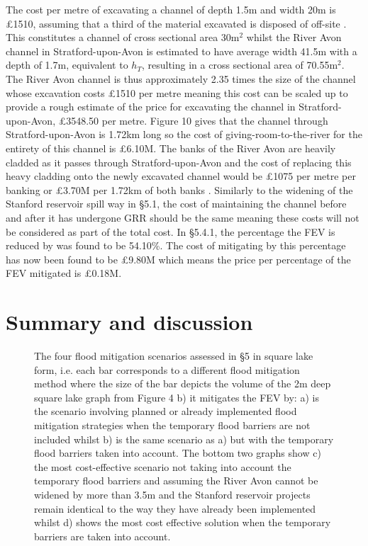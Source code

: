 \documentclass[11pt,a4paper]{article}
\begin{document}
\noindent The cost per metre of excavating a channel of depth 1.5m and width 20m is \pounds1510, assuming that a third of the material excavated is disposed of off-site \cite{cost1}. This constitutes a channel of cross sectional area 30m$^2$ whilst the River Avon channel in Stratford-upon-Avon is estimated to have average width 41.5m \cite{maps} with a depth of 1.7m, equivalent to $h_T$, resulting in a cross sectional area of 70.55m$^2$. The River Avon channel is thus approximately 2.35 times the size of the channel whose excavation costs \pounds1510 per metre meaning this cost can be scaled up to provide a rough estimate of the price for excavating the channel in Stratford-upon-Avon, \pounds3548.50 per metre. Figure 10 gives that the channel through Stratford-upon-Avon is 1.72km long so the cost of giving-room-to-the-river for the entirety of this channel is \pounds6.10M. The banks of the River Avon are heavily cladded as it passes through Stratford-upon-Avon and the cost of replacing this heavy cladding onto the newly excavated channel would be \pounds1075 per metre per banking or \pounds3.70M per 1.72km of both banks \cite{cost1}. Similarly to the widening of the Stanford reservoir spill way in \S5.1, the cost of maintaining the channel before and after it has undergone GRR should be the same meaning these costs will not be considered as part of the total cost. In \S 5.4.1, the percentage the FEV is reduced by was found to be 54.10\%. The cost of mitigating by this percentage has now been found to be \pounds9.80M which means the price per percentage of the FEV mitigated is \pounds0.18M.

\section{Summary and discussion}
\begin{figure}[ht!]
\hfill
{}
\caption{The four flood mitigation scenarios assessed in \S 5 in square lake form, i.e. each bar corresponds to a different flood mitigation method where the size of the bar depicts the volume of the 2m deep square lake graph from Figure 4 b) it mitigates the FEV by: a) is the scenario involving planned or already implemented flood mitigation strategies when the temporary flood barriers are not included whilst b) is the same scenario as a) but with the temporary flood barriers taken into account. The bottom two graphs show c) the most cost-effective scenario not taking into account the temporary flood barriers and assuming the River Avon cannot be widened by more than 3.5m and the Stanford reservoir projects remain identical to the way they have already been implemented whilst d) shows the most cost effective solution when the temporary barriers are taken into account.}
\end{figure}
\end{document}
